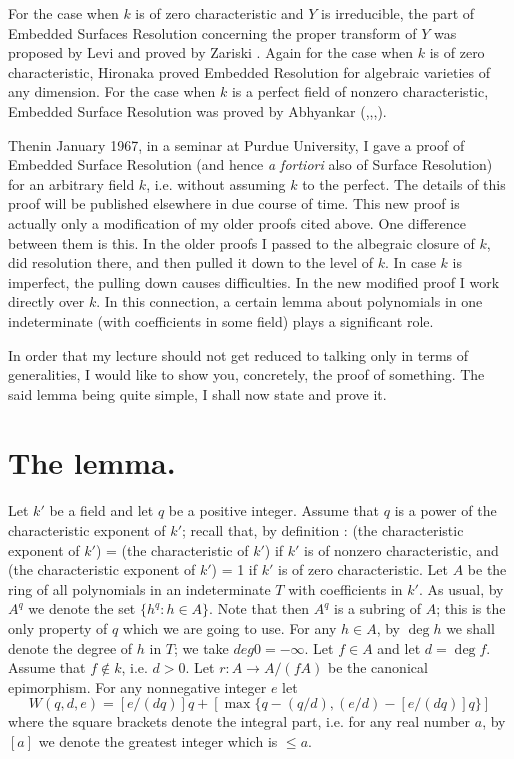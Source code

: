 For the case when $k$ is of zero characteristic and $Y$ is irreducible, the part of Embedded Surfaces Resolution concerning the proper transform of $Y$ was proposed by Levi \cite{art01-key13} and proved by Zariski \cite{art01-key18}. Again for the case when $k$ is of zero characteristic, Hironaka \cite{art01-key12} proved Embedded Resolution for algebraic varieties of any dimension. For the case when $k$ is a perfect field of nonzero characteristic, Embedded Surface Resolution was proved by Abhyankar (\cite{art01-key7},\cite{art01-key9},\cite{art01-key10},\cite{art01-key11}).

Then\pageoriginale in January 1967, in a seminar at Purdue University, I gave a proof of Embedded Surface Resolution (and hence {\em a fortiori} also of Surface Resolution) for an arbitrary field $k$, i.e. without assuming $k$ to the perfect. The details of this proof will be published elsewhere in due course of time. This new proof is actually only a modification of my older proofs cited above. One difference between them is this. In the older proofs I passed to the albegraic closure of $k$, did resolution there, and then pulled it down to the level of $k$. In case $k$ is imperfect, the pulling down causes difficulties. In the new modified proof I work directly over $k$. In this connection, a certain lemma about polynomials in one indeterminate (with coefficients in some field) plays a significant role.

In order that my lecture should not get reduced to talking only in terms of generalities, I would like to show you, concretely, the proof of something. The said lemma being quite simple, I shall now state and prove it.

\section{The lemma.}\label{art01-sec2}

Let $k'$ be a field and let $q$ be a positive integer. Assume that $q$ is a power of the characteristic exponent of $k'$; recall that, by definition : (the characteristic exponent of $k'$) = (the characteristic of $k'$) if $k'$ is of nonzero characteristic, and (the characteristic exponent of $k'$) = 1 if $k'$ is of zero characteristic. Let $A$ be the ring of all polynomials in an indeterminate $T$ with coefficients in $k'$. As usual, by $A^{q}$ we denote the set $\{h^{q}:h\in A\}$. Note that then $A^{q}$ is a subring of $A$; this is the only property of $q$ which we are going to use. For any $h\in A$, by $\deg h$ we shall denote the degree of $h$ in $T$; we take $deg 0 = -\infty$. Let $f\in A$ and let $d=\deg f$. Assume that $f\not\in k$, i.e. $d>0$. Let $r:A\to A/(fA)$ be the canonical epimorphism. For any nonnegative integer $e$ let
$$
W(q,d,e)=[e/(dq)]q+[\max \{q-(q/d),(e/d)-[e/(dq)]q\}]
$$
where the square brackets denote the integral part, i.e. for any real number $a$, by $[a]$ we denote the greatest integer which is $\leq a$.


